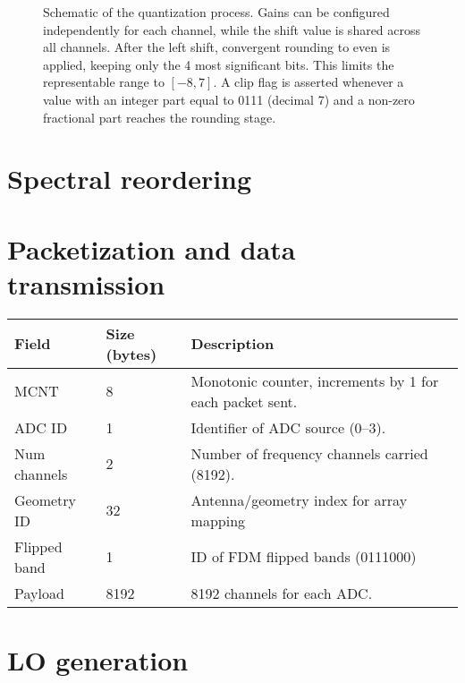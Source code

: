 \begin{figure}
    \caption[Schematic of the quantization process]{Schematic of the quantization process. Gains can be configured independently for each channel, while the shift value is shared across all channels. After the left shift, convergent rounding to even is applied, keeping only the 4 most significant bits. This limits the representable range to $[-8,7]$. A clip flag is asserted whenever a value with an integer part equal to 0111 (decimal 7) and a non-zero fractional part reaches the rounding stage.}
    \label{fig:quantizer_architecture}
\end{figure}
\section{Spectral reordering}
\label{sec:spectral_reordering}


\section{Packetization and data transmission}

\label{sec:packetization}

\begin{table}[htbp]
\centering
\label{tab:packet_format}
\begin{tabular}{lll}
\toprule
\textbf{Field} & \textbf{Size (bytes)} & \textbf{Description} \\
\midrule
MCNT           & 8   & Monotonic counter, increments by 1 for each packet sent. \\
ADC ID         & 1   & Identifier of ADC source (0--3). \\
Num channels   & 2   & Number of frequency channels carried (8192). \\
Geometry ID    & 32   & Antenna/geometry index for array mapping\\
Flipped band & 1 & ID of FDM flipped bands (0111000) \\
Payload & 8192 & 8192 channels for each ADC.\\

\bottomrule
\end{tabular}
\end{table}

\section{LO generation}
\label{sec:lo_generation}